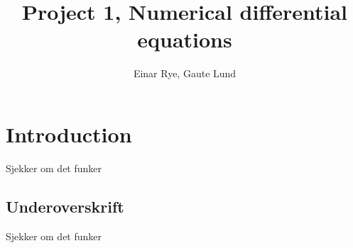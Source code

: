 \documentclass{article}
\begin{document}
\author{Einar Rye, Gaute Lund}
\title{Project 1, Numerical differential equations}
\maketitle

\section{Introduction}
Sjekker om det funker

\subsection{Underoverskrift}
Sjekker om det funker
\end{document}
